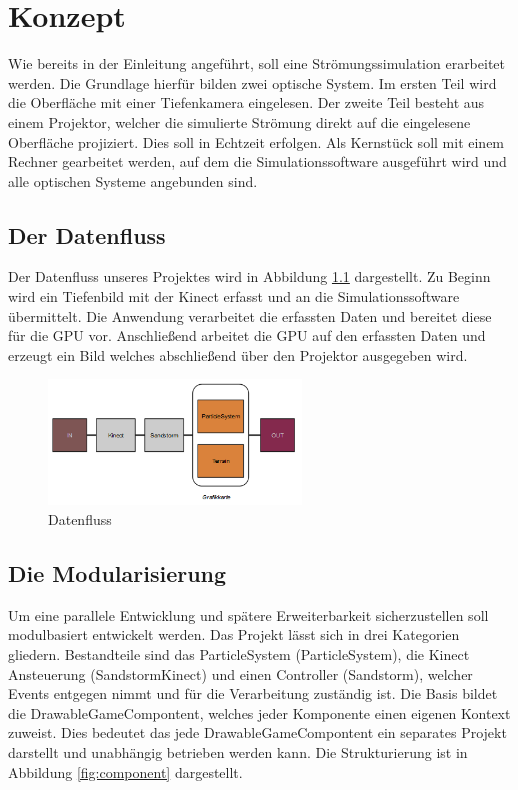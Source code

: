 \chapter{Konzept}
\begin{Spacing}{\mylinespace}

Wie bereits in der Einleitung angeführt, soll eine Strömungssimulation erarbeitet werden. Die Grundlage hierfür bilden zwei optische System. Im ersten Teil wird die Oberfläche mit einer Tiefenkamera eingelesen. Der zweite Teil besteht aus einem Projektor, welcher die simulierte Strömung direkt auf die eingelesene Oberfläche projiziert. Dies soll in Echtzeit erfolgen. Als Kernstück soll mit einem Rechner gearbeitet werden, auf dem die Simulationssoftware ausgeführt wird und alle optischen Systeme angebunden sind.

\section{Der Datenfluss}
Der Datenfluss unseres Projektes wird in Abbildung \ref{fig:dataFlow} dargestellt. Zu Beginn wird ein Tiefenbild mit der Kinect erfasst und an die Simulationssoftware übermittelt. Die Anwendung verarbeitet die erfassten Daten und bereitet diese für die GPU vor. Anschließend arbeitet die GPU auf den erfassten Daten und erzeugt ein Bild welches abschließend über den Projektor ausgegeben wird.

\begin{figure}[h!]
	\centering
	\vspace*{20px}
	\includegraphics[width=0.6\textwidth]{graphics/flow.png}
	\caption{Datenfluss}
	\label{fig:dataFlow}
\end{figure}

\section{Die Modularisierung}
Um eine parallele Entwicklung und spätere Erweiterbarkeit sicherzustellen soll modulbasiert entwickelt werden. Das Projekt lässt sich in drei Kategorien gliedern. Bestandteile sind das ParticleSystem (ParticleSystem), die Kinect Ansteuerung (SandstormKinect) und einen Controller (Sandstorm), welcher Events entgegen nimmt und für die Verarbeitung zuständig ist. Die Basis bildet die DrawableGameCompontent, welches jeder Komponente einen eigenen Kontext zuweist. Dies bedeutet das jede DrawableGameCompontent ein separates Projekt darstellt und unabhängig betrieben werden kann. Die Strukturierung ist in Abbildung \ref{fig:component} dargestellt.


\end{Spacing}
